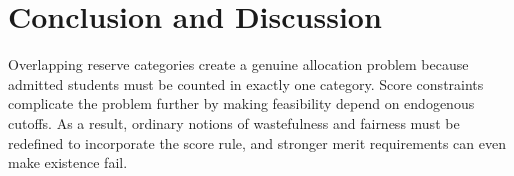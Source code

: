 \documentclass[12pt]{article}
\newtheorem{example}{Example}
\newcommand{\1}{\mathbf{1}}
\begin{document}







\section{Conclusion and Discussion}
Overlapping reserve categories create a genuine allocation problem because admitted students must be counted in exactly one category. Score constraints complicate the problem further by making feasibility depend on endogenous cutoffs. As a result, ordinary notions of wastefulness and fairness must be redefined to incorporate the score rule, and stronger merit requirements can even make existence fail.
\end{document}
